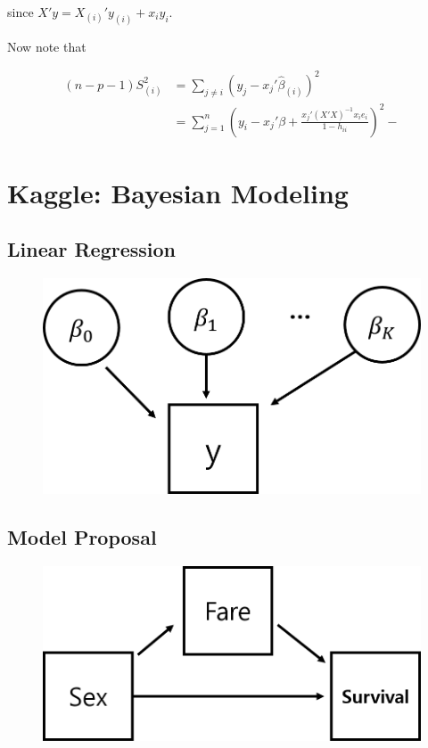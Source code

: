\documentclass[12pt]{article}
\begin{document}
since $X'y = X_{(i)}' y_{(i)} + x_i y_i$. 


Now note that 

$$
\begin{aligned}
(n-p-1)S_{(i)}^2 &= \sum_{j \neq i}  \left( y_j - x_j' \hat{\beta}_(i) \right)^2 \\[8pt]
&= \sum_{j=1}^n \left( y_i - x_j' \beta + \frac{ x_j'(X'X)^{-1}x_i e_i }{ 1-h_{ii} } \right)^2 - 
\end{aligned}
$$

\pagebreak

\section*{Kaggle: Bayesian Modeling}


\setcounter{section}{1}
\setcounter{subsection}{0}

\subsection{Linear Regression}

\begin{figure}[h!]
	\centering
	\includegraphics[scale=0.5]{regModel.png}
\end{figure}


\subsection{Model Proposal}

\begin{figure}[h!]
	\centering
	\includegraphics[scale=0.5]{titanicModel.png}
\end{figure}
\end{document}
